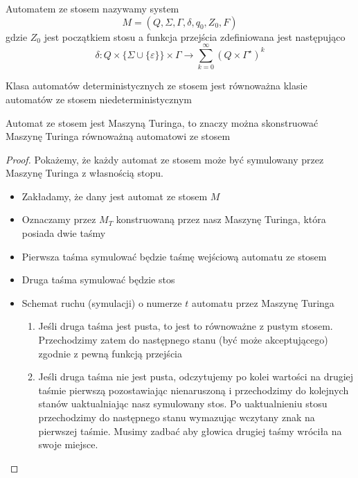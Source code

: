 \begin{df}
	Automatem ze stosem nazywamy system 
	\begin{equation}
		M = (Q, \Sigma, \Gamma, \delta, q_0, Z_0, F)
	\end{equation}
	gdzie $Z_0$ jest początkiem stosu a funkcja przejścia zdefiniowana jest następująco
	\begin{equation}
		\delta : Q \times \{\Sigma \cup \{ \varepsilon \} \}	\times \Gamma \rightarrow 
		\sum_{k=0}^\infty (Q\times\Gamma^\star)^k
	\end{equation}
\end{df}

\begin{tw}
	Klasa automatów deterministycznych ze stosem jest równoważna klasie automatów ze stosem niedeterministycznym
\end{tw}

\begin{tw}
	Automat ze stosem jest Maszyną Turinga, to znaczy można skonstruować Maszynę Turinga równoważną automatowi ze stosem
	\begin{proof}
		Pokażemy, że każdy automat ze stosem może być symulowany przez Maszynę Turinga z własnością stopu.
		\begin{itemize}
			\item Zakładamy, że dany jest automat ze stosem $M$
			\item Oznaczamy przez $M_T$ konstruowaną przez nasz Maszynę Turinga, która posiada dwie taśmy
			\item Pierwsza taśma symulować będzie taśmę wejściową automatu ze stosem
			\item Druga taśma symulować będzie stos
			\item Schemat ruchu (symulacji) o numerze $t$ automatu przez Maszynę Turinga
				\begin{enumerate}
					\item Jeśli druga taśma jest pusta, to jest to równoważne z pustym stosem. 
					Przechodzimy zatem do następnego stanu (być może akceptującego) 
					zgodnie z pewną funkcją przejścia
					\item Jeśli druga taśma nie jest pusta, odczytujemy po kolei wartości na drugiej taśmie
					pierwszą pozostawiając nienaruszoną i przechodzimy do kolejnych stanów uaktualniając nasz
					symulowany stos. Po uaktualnieniu stosu przechodzimy do następnego stanu wymazując
					wczytany znak na pierwszej taśmie. Musimy zadbać aby głowica drugiej taśmy wróciła na swoje
					miejsce.					
				\end{enumerate}
		\end{itemize}
	\end{proof}
\end{tw}

